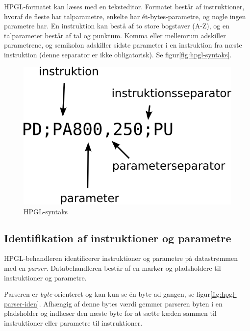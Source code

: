 HPGL-formatet kan læses med en teksteditor. Formatet består af
instruktioner, hvoraf de fleste har talparametre, enkelte har
ét-bytes-parametre, og nogle ingen parametre har. En instruktion kan
bestå af to store bogstaver (A-Z), og en talparameter består af tal og
punktum. Komma eller mellemrum adskiller parametrene, og semikolon
adskiller sidste parameter i en instruktion fra næste instruktion
(denne separator er ikke obligatorisk). Se figur\vref{fig:hpgl-syntaks}.

\begin{figure}[htbp]
  \centering
  \includegraphics[width=.4\textwidth]{./img/hpgl-syntaks}
  \caption{HPGL-syntaks}
  \label{fig:hpgl-syntaks}
\end{figure}


\subsection{Identifikation af instruktioner og parametre}
\label{sc:idn-ins-param}


HPGL-behandleren identificerer instruktioner og parametre på
datastrømmen med en \textit{parser}. Databehandleren består af en
markør og pladsholdere til instruktioner og parametre.

Parseren er \textit{byte}-orienteret og kan kun se én byte ad gangen,
se figur\vref{fig:hpgl-parser-iden}. Afhængig af denne bytes værdi
gemmer parseren byten i en pladsholder og indlæser den næste byte for
at sætte kæden sammen til instruktioner eller parametre til
instruktioner.


